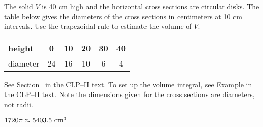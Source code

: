 \begin{question}[1997D]\label{prob_s1.11_tableproblem1}
The solid $V$ is 40 cm high and the horizontal cross sections
are circular disks. The table below gives the diameters of the cross sections
in centimeters at 10 cm intervals. Use the trapezoidal rule to estimate
the volume of $V$.

\renewcommand{\arraystretch}{1.1}
\begin{center}
     \begin{tabular}{|l|c|c|c|c|c|}
          \hline
          height&0&10&20&30&40  \\
          \hline
          diameter&24&16&10&6&4 \\
          \hline
     \end{tabular}
\end{center}
\renewcommand{\arraystretch}{1.0}
\end{question}

\begin{hint}
See Section~ in the
CLP--II text.
To set up the volume integral, see Example  in the
CLP--II text. Note the dimensions given for the cross sections are diameters, not radii.
\end{hint}

\begin{answer}
$1720\pi\approx 5403.5\ {\rm cm}^3$
\end{answer}

